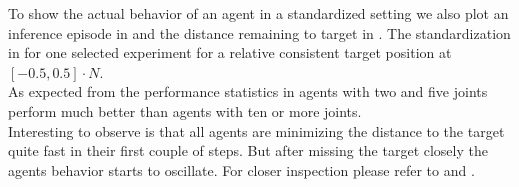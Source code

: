 To show the actual behavior of an agent in a standardized setting we also plot an inference episode in  and the distance remaining to target in . The standardization in  for one selected experiment for a relative consistent target position at $[-0.5, 0.5] \cdot N$. \\
As expected from the performance statistics in  agents with two and five joints perform much better than agents with ten or more joints. \\
Interesting to observe is that all agents are minimizing the distance to the target quite fast in their first couple of steps. But after missing the target closely the agents behavior starts to oscillate.
For closer inspection please refer to  and . \\


